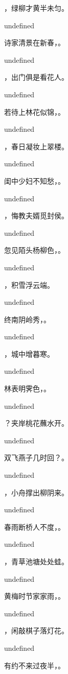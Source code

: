 \documentclass[12pt, a4paper, addpoints]{exam}
\begin{document}
\begin{questions}
\question[3] \fillin，绿柳才黄半未匀。

undefined

\question[3] 诗家清景在新春，\fillin。

undefined

\question[3] \fillin，出门俱是看花人。

undefined

\question[3] 若待上林花似锦，\fillin。

undefined

\question[3] \fillin，春日凝妆上翠楼。

undefined

\question[3] 闺中少妇不知愁，\fillin。

undefined

\question[3] \fillin，悔教夫婿觅封侯。

undefined

\question[3] 忽见陌头杨柳色，\fillin。

undefined

\question[3] \fillin，积雪浮云端。

undefined

\question[3] 终南阴岭秀，\fillin。

undefined

\question[3] \fillin，城中增暮寒。

undefined

\question[3] 林表明霁色，\fillin。

undefined

\question[3] \fillin？夹岸桃花蘸水开。

undefined

\question[3] 双飞燕子几时回？\fillin。

undefined

\question[3] \fillin，小舟撑出柳阴来。

undefined

\question[3] 春雨断桥人不度，\fillin。

undefined

\question[3] \fillin，青草池塘处处蛙。

undefined

\question[3] 黄梅时节家家雨，\fillin。

undefined

\question[3] \fillin，闲敲棋子落灯花。

undefined

\question[3] 有约不来过夜半，\fillin。


\end{questions}
\end{document}
